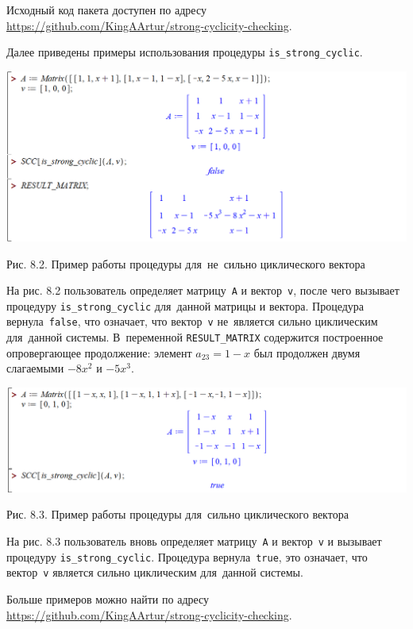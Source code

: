 Исходный код пакета доступен по адресу\\
\url{https://github.com/KingAArtur/strong-cyclicity-checking}.

\medskip
Далее приведены примеры использования процедуры \verb|is_strong_cyclic|.
\begin{center}
    \includegraphics[scale=0.6]{pictures/maple_example4.png}

    \small
    Рис. 8.2. Пример работы процедуры для~не~сильно циклического вектора
\end{center}

На рис. 8.2 пользователь определяет матрицу~\verb|A| и вектор~\verb|v|,
после чего вызывает процедуру \verb|is_strong_cyclic| для~данной матрицы и вектора.
Процедура вернула~\verb|false|, что означает, что вектор~\verb|v| не~является сильно циклическим для~данной системы.
В~переменной \verb|RESULT_MATRIX| содержится построенное опровергающее продолжение:
элемент $a_{23} = 1 - x$ был продолжен двумя слагаемыми $-8x^2$ и $-5x^3$.

\begin{center}
    \includegraphics[scale=0.6]{pictures/maple_example1.png}

    \small
    Рис. 8.3. Пример работы процедуры для~сильно циклического вектора
\end{center}

На рис. 8.3 пользователь вновь определяет матрицу~\verb|A| и вектор~\verb|v| и
вызывает процедуру \verb|is_strong_cyclic|.
Процедура вернула~\verb|true|, это означает, что вектор~\verb|v| является сильно циклическим для~данной системы.

Больше примеров можно найти по адресу\\
\url{https://github.com/KingAArtur/strong-cyclicity-checking}.